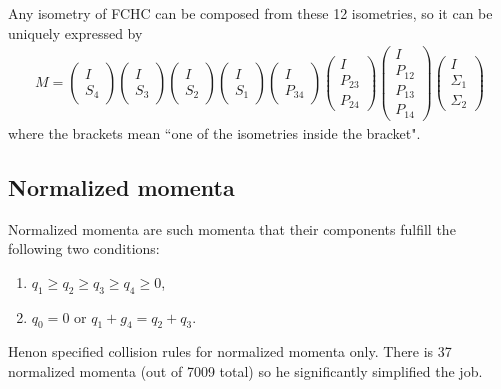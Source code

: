 Any isometry of FCHC can be composed from these 12 isometries,
so it can be uniquely expressed by
\begin{align}
M = 
\begin{pmatrix}
I\\
S_4
\end{pmatrix}
\begin{pmatrix}
I\\
S_3
\end{pmatrix}
\begin{pmatrix}
I\\
S_2
\end{pmatrix}
\begin{pmatrix}
I\\
S_1
\end{pmatrix}
\begin{pmatrix}
I\\
P_{34}
\end{pmatrix}
\begin{pmatrix}
I\\
P_{23}\\
P_{24}
\end{pmatrix}
\begin{pmatrix}
I\\
P_{12}\\
P_{13}\\
P_{14}
\end{pmatrix}
\begin{pmatrix}
I\\
\Sigma_1\\
\Sigma_2
\end{pmatrix}
\end{align} 
where the brackets mean ``one of the isometries inside the bracket".


\subsection{Normalized momenta}
Normalized momenta are such momenta that their components fulfill the following two conditions:
\begin{enumerate}
\item $q_1 \geq q_2 \geq q_3 \geq q_4 \geq 0$,  \label{normMom}
\item $q_0 = 0$ or $q_1+g_4 = q_2 + q_3$.
\end{enumerate}


Henon specified collision rules for normalized momenta only. There is 37 normalized momenta (out of 7009 total) so he significantly simplified the job.

